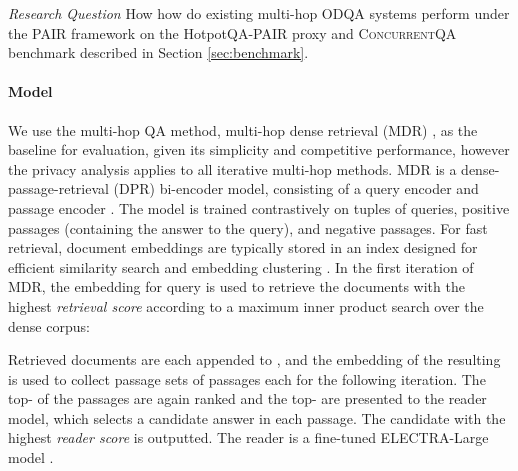 \documentclass{article}
\renewcommand\cite{\citep}	\newcommand\shortcite{\citeyearpar}\newcommand\newcite{\citet}
\newcommand{\datasetname}{\textsc{ConcurrentQA}\xspace}
\newcommand{\problemshortname}{\textsc{PAIR}\xspace}
\begin{document}
\textit{Research Question} How how do existing multi-hop ODQA systems perform under the \problemshortname framework on the HotpotQA-\problemshortname proxy and \datasetname benchmark described in Section \ref{sec:benchmark}.


\paragraph{Model} We use the multi-hop QA method, multi-hop dense retrieval (MDR) \cite{xiong2021mdr}, as the baseline for evaluation, given its simplicity and competitive performance, however the privacy analysis applies to all iterative multi-hop methods. MDR is a dense-passage-retrieval (DPR) bi-encoder model, consisting of a query encoder  and passage encoder  \cite{karpukhin2020dpr}. The model is trained contrastively on tuples of queries, positive passages (containing the answer to the query), and negative passages. For fast retrieval, document embeddings are typically stored in an index designed for efficient similarity search and embedding clustering \cite{faiss2017}. In the first iteration of MDR, the embedding for query  is used to retrieve the  documents  with the highest \textit{retrieval score} according to a maximum inner product search over the dense corpus: 
{}

Retrieved documents are each appended to , and the embedding of the resulting  is used to collect  passage sets of  passages each for the following iteration. The top- of the  passages are again ranked and the top- are presented to the reader model, which selects a candidate answer in each passage. The candidate with the highest \textit{reader score} is outputted. The reader is a fine-tuned ELECTRA-Large model \cite{clark2020electra}.
\end{document}

